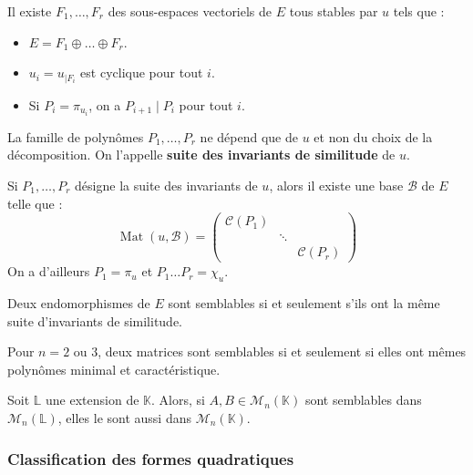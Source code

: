 	
	\begin{theorem}
		Il existe $F_1, \dots, F_r$ des sous-espaces vectoriels de $E$ tous stables par $u$ tels que :
		\begin{itemize}
			\item $E = F_1 \oplus \dots \oplus F_r$.
			\item $u_i = u_{|F_i}$ est cyclique pour tout $i$.
			\item Si $P_i = \pi_{u_i}$, on a $P_{i+1} \mid P_i$ pour tout $i$.
		\end{itemize}
		La famille de polynômes $P_1, \dots, P_r$ ne dépend que de $u$ et non du choix de la décomposition. On l'appelle \textbf{suite des invariants de similitude} de $u$.
	\end{theorem}
	
	\begin{theorem}
		Si $P_1, \dots, P_r$ désigne la suite des invariants de $u$, alors il existe une base $\mathcal{B}$ de $E$ telle que :
		\[ \operatorname{Mat}(u, \mathcal{B}) = \begin{pmatrix} \mathcal{C}(P_1) & & \\ & \ddots & \\ & & \mathcal{C}(P_r) \end{pmatrix} \]
		On a d'ailleurs $P_1 = \pi_u$ et $P_1 \dots P_r = \chi_u$.
	\end{theorem}
	
	\begin{corollary}
		Deux endomorphismes de $E$ sont semblables si et seulement s'ils ont la même suite d'invariants de similitude.
	\end{corollary}
	
	\begin{application}
		Pour $n = 2$ ou $3$, deux matrices sont semblables si et seulement si elles ont mêmes polynômes minimal et caractéristique.
	\end{application}
	
	\begin{application}
		Soit $\mathbb{L}$ une extension de $\mathbb{K}$. Alors, si $A, B \in \mathcal{M}_n(\mathbb{K})$ sont semblables dans $\mathcal{M}_n(\mathbb{L})$, elles le sont aussi dans $\mathcal{M}_n(\mathbb{K})$.
	\end{application}
	
	\subsubsection{Classification des formes quadratiques}
	
